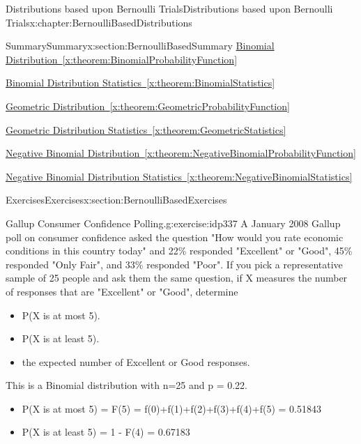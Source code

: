 \documentclass[oneside,10pt,]{book}
\newcommand{\xreffont}{\relax}
\numberwithin{equation}{section}
\begin{document}
\begin{chapterptx}{Distributions based upon Bernoulli Trials}{}{Distributions based upon Bernoulli Trials}{}{}{x:chapter:BernoulliBasedDistributions}
\begin{sectionptx}{Summary}{}{Summary}{}{}{x:section:BernoulliBasedSummary}
\hyperref[x:theorem:BinomialProbabilityFunction]{Binomial Distribution~{\xreffont\ref{x:theorem:BinomialProbabilityFunction}}}%
\par
\hyperref[x:theorem:BinomialStatistics]{Binomial Distribution Statistics~{\xreffont\ref{x:theorem:BinomialStatistics}}}%
\par
\hyperref[x:theorem:GeometricProbabilityFunction]{Geometric Distribution~{\xreffont\ref{x:theorem:GeometricProbabilityFunction}}}%
\par
\hyperref[x:theorem:GeometricStatistics]{Geometric Distribution Statistics~{\xreffont\ref{x:theorem:GeometricStatistics}}}%
\par
\hyperref[x:theorem:NegativeBinomialProbabilityFunction]{Negative Binomial Distribution~{\xreffont\ref{x:theorem:NegativeBinomialProbabilityFunction}}}%
\par
\hyperref[x:theorem:NegativeBinomialStatistics]{Negative Binomial Distribution Statistics~{\xreffont\ref{x:theorem:NegativeBinomialStatistics}}}%
\end{sectionptx}
%
%
\typeout{************************************************}
\typeout{************************************************}
%
\begin{sectionptx}{Exercises}{}{Exercises}{}{}{x:section:BernoulliBasedExercises}
\begin{inlineexercise}{Gallup Consumer Confidence Polling.}{g:exercise:idp337}%
A January 2008 Gallup poll on consumer confidence asked the question "How would you rate economic conditions in this country today" and 22\% responded "Excellent" or "Good", 45\% responded "Only Fair", and 33\% responded "Poor". If you pick a representative sample of 25 people and ask them the same question, if X measures the number of responses that are "Excellent" or "Good", determine%
\begin{itemize}[label=\textbullet]
\item{}P(X is at most 5).%
\item{}P(X is at least 5).%
\item{}the expected number of Excellent or Good responses.%
\end{itemize}
%
\par\smallskip%
\noindent\hypertarget{g:solution:idp338}{}This is a Binomial distribution with n=25 and p = 0.22.%
\begin{itemize}[label=\textbullet]
\item{}P(X is at most 5) = F(5) = f(0)+f(1)+f(2)+f(3)+f(4)+f(5) = 0.51843%
\item{}P(X is at least 5) = 1 - F(4) = 0.67183%

\end{itemize}
\end{inlineexercise}
\end{sectionptx}
\end{chapterptx}
\end{document}
